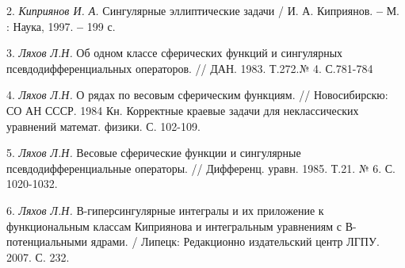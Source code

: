 2. {\it Киприянов И. А.} Сингулярные эллиптические задачи / И. А. Киприянов.
{\bf --} М. : Наука, 1997. {\bf --} 199 с.

3. {\it Ляхов Л.Н.} Об одном классе сферических функций и сингулярных псевдодифференциальных операторов. // ДАН. 1983. Т.272.№ 4. С.781-784

4. {\it Ляхов Л.Н.} О рядах по весовым сферическим функциям. //
Новосибирскю: СО АН СССР. 1984
Кн. Корректные краевые задачи для неклассических уравнений математ. физики. С. 102-109.

5. {\it Ляхов Л.Н.} Весовые сферические функции и сингулярные псевдодифференциальные операторы.
// Дифференц. уравн. 1985. Т.21. № 6. С. 1020-1032.

6. {\it Ляхов Л.Н. }
В-гиперсингулярные интегралы и их приложение к функциональным классам Киприянова и интегральным уравнениям с В-потенциальными ядрами.
/ Липецк: Редакционно издательский центр ЛГПУ. 2007. С. 232.
